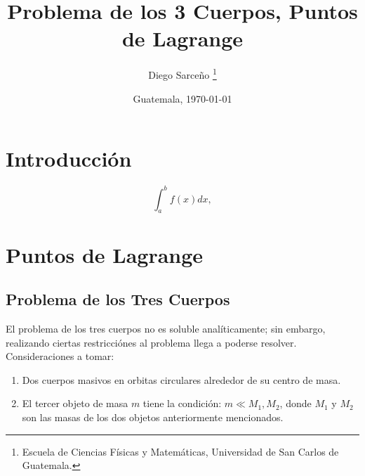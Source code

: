 







\title{\sc Problema de los 3 Cuerpos, Puntos de Lagrange}%
\author{Diego Sarceño \thanks{Escuela de Ciencias Físicas y Matemáticas,
  Universidad de San Carlos de Guatemala.}}
\date{Guatemala, \today}

  
\maketitle

\begin{abstract}
  \lipsum[1]
\end{abstract}


\section{Introducción}
\label{sec:intro}
\justify 
\lipsum[1]
% 
\begin{displaymath}
  \int_a^b f(x) dx,
\end{displaymath}
%
\lipsum[1]

\section{Puntos de Lagrange}
\subsection{Problema de los Tres Cuerpos}
\label{sec:Puntos de Lagrange}

El problema de los tres cuerpos no es soluble analíticamente; sin embargo, realizando ciertas restricciónes al problema llega a poderse resolver. Consideraciones a tomar:
\begin{enumerate}
	\item Dos cuerpos masivos en orbitas circulares alrededor de su centro de masa.
	\item El tercer objeto de masa $m$ tiene la condición: $m\ll M_1,M_2$, donde $M_1$ y $M_2$ son las masas de los dos objetos anteriormente mencionados.
\end{enumerate}

